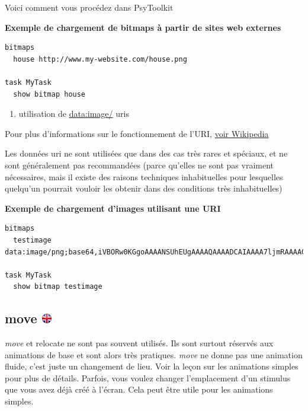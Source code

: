 \documentclass[
]{book}
\providecommand{\tightlist}{%
  \setlength{\itemsep}{0pt}\setlength{\parskip}{0pt}}
\begin{document}
Voici comment vous procédez dans PsyToolkit

\textbf{Exemple de chargement de bitmaps à partir de sites web externes}

\begin{verbatim}
bitmaps
  house http://www.my-website.com/house.png

task MyTask
  show bitmap house
\end{verbatim}

\begin{enumerate}
\def\labelenumi{\arabic{enumi}.}
\setcounter{enumi}{1}
\tightlist
\item
  utilisation de \url{data:image/} uris
\end{enumerate}

Pour plus d'informations sur le fonctionnement de l'URI, \href{http://en.wikipedia.org/wiki/Data_URI_scheme}{voir Wikipedia}

Les données uri ne sont utilisées que dans des cas très rares et spéciaux, et ne sont généralement pas recommandées (parce qu'elles ne sont pas vraiment nécessaires, mais il existe des raisons techniques inhabituelles pour lesquelles quelqu'un pourrait vouloir les obtenir dans des conditions très inhabituelles)

\textbf{Exemple de chargement d'images utilisant une URI}

\begin{verbatim}
bitmaps
  testimage data:image/png;base64,iVBORw0KGgoAAAANSUhEUgAAAAQAAAADCAIAAAA7ljmRAAAAGElEQVQIW2P4DwcMDAxAfBvMAhEQMYgcACEHG8ELxtbPAAAAAElFTkSuQmCC

task MyTask
  show bitmap testimage
\end{verbatim}

\hypertarget{move}{%
\subsection[move ]{\texorpdfstring{move \href{https://www.psytoolkit.org/doc3.4.0/syntax.html\#move}{\protect\includegraphics{img/ukflag.png}}}{move }}\label{move}}

\emph{move} et relocate ne sont pas souvent utilisés. Ils sont surtout réservés aux animations de base et sont alors très pratiques.
\emph{move} ne donne pas une animation fluide, c'est juste un changement de lieu. Voir la leçon sur les animations simples pour plus de détails.
Parfois, vous voulez changer l'emplacement d'un stimulus que vous avez déjà créé à l'écran. Cela peut être utile pour les animations simples.
\end{document}
